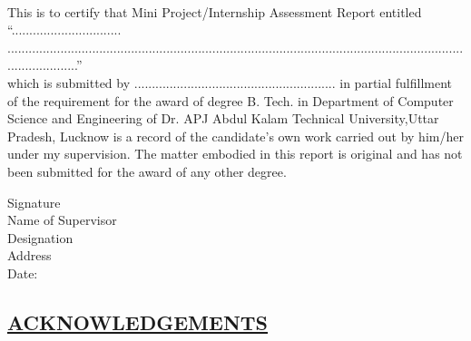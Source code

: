 \\
\doublespacing
This is to certify that Mini Project/Internship Assessment Report entitled “...............................\\.....................................................................................................................................................”\\which
is submitted by ......................................................... in partial fulfillment of the requirement for the award of degree B. Tech. in Department of Computer Science and Engineering of Dr. APJ Abdul Kalam Technical University,Uttar Pradesh, Lucknow is a record of the candidate’s own work carried out by him/her under my supervision. The matter embodied in this report is original and has not been submitted for the award of any other degree.
\vspace{15 mm}
\\
\begin{flushleft}

Signature\\
\vspace{10 mm}
Name of Supervisor\\
Designation\\
Address\\
\vspace{10mm}
Date:
\end{flushleft}
\newpage
\begin{center}
 \section*{\size \underline{ACKNOWLEDGEMENTS}} 
\end{center}
\\
